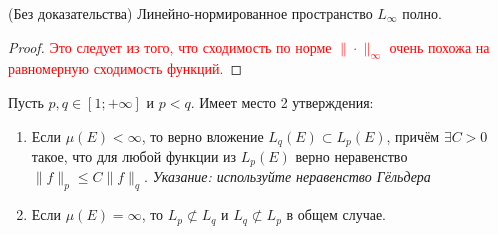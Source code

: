 \begin{theorem} (Без доказательства)
	Линейно-нормированное пространство $L_\infty$ полно.
\end{theorem}

\begin{proof}
	\textcolor{red}{Это следует из того, что сходимость по норме $\|\cdot\|_\infty$ очень похожа на равномерную сходимость функций.}
\end{proof}

\begin{exercise}
	Пусть $p, q \in [1; +\infty]$ и $p < q$. Имеет место 2 утверждения:
	\begin{enumerate}
		\item Если $\mu(E) < \infty$, то верно вложение $L_q(E) \subset L_p(E)$, причём $\exists C > 0$ такое, что для любой функции из $L_p(E)$ верно неравенство $\|f\|_p \le C\|f\|_q$. \textit{Указание: используйте неравенство Гёльдера}
		
		\item Если $\mu(E) = \infty$, то $L_p \not\subset L_q$ и $L_q \not\subset L_p$ в общем случае.
	\end{enumerate}
\end{exercise}